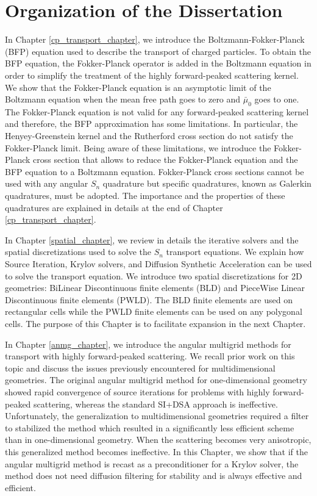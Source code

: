 \section{Organization of the Dissertation}
\noindent In Chapter \ref{cp_transport_chapter}, we introduce the 
Boltzmann-Fokker-Planck (BFP) equation used to describe the transport of
charged particles. To obtain the BFP equation, the Fokker-Planck operator is
added in the Boltzmann equation in order to simplify the treatment of the
highly forward-peaked scattering kernel. We show that the Fokker-Planck
equation is an asymptotic limit of the Boltzmann equation when the mean free
path goes to zero and $\bar{\mu}_0$ goes to one. The Fokker-Planck equation is
not valid for any forward-peaked scattering kernel and therefore, the BFP
approximation has some limitations. In particular, the Henyey-Greenstein
kernel and the Rutherford cross section do not satisfy the Fokker-Planck
limit. Being aware of these limitations, we introduce the Fokker-Planck cross
section that allows to reduce the Fokker-Planck equation and the BFP equation
to a Boltzmann equation. Fokker-Planck cross sections cannot be used with any
angular $S_n$ quadrature but specific quadratures, known as Galerkin
quadratures, must be adopted. The importance and the properties of these
quadratures are explained in details at the end of Chapter
\ref{cp_transport_chapter}.

In Chapter \ref{spatial_chapter}, we review in details the iterative
solvers and the spatial discretizations used to solve the $S_n$ transport 
equations. We explain how Source Iteration, Krylov solvers, and Diffusion 
Synthetic Acceleration can be used to solve the transport equation.
We introduce two spatial discretizations for 2D geometries: BiLinear 
Discontinuous finite elements (BLD) and PieceWise 
Linear Discontinuous finite elements (PWLD). The BLD finite elements are used 
on rectangular cells while the PWLD finite elements can be used on any polygonal 
cells. The purpose of this Chapter is to facilitate expansion in the next
Chapter.

In Chapter \ref{anmg_chapter}, we introduce the angular multigrid 
methods for transport with highly forward-peaked scattering. We recall  
prior work on this topic and discuss the issues previously encountered for 
multidimensional geometries. The original angular multigrid method for 
one-dimensional geometry showed rapid convergence of source iterations for 
problems with highly forward-peaked scattering, whereas the standard SI+DSA
approach is ineffective. Unfortunately, the 
generalization to multidimensional geometries required a filter to stabilized 
the method which resulted in a significantly less efficient scheme than in 
one-dimensional geometry. When 
the scattering becomes very anisotropic, this generalized method becomes
ineffective. In this Chapter, we show that if the angular multigrid method is 
recast as a preconditioner for a Krylov solver, the method does not need 
diffusion filtering for stability and is always effective and efficient.

